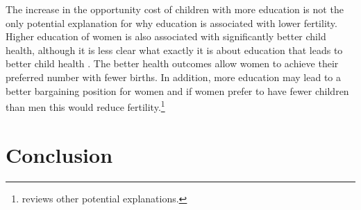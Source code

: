 \documentclass[]{article}
\begin{document}
The increase in the opportunity cost of children with more education is not the only potential explanation for why education is associated with lower fertility. Higher education of women is also associated with significantly better child health, although it is less clear what exactly it is about education that leads to better child health \citep{Thomas1991,Glewwe1999,Kovsted2002}. The better health outcomes allow women to achieve their preferred number with fewer births. In addition, more education may lead to a better bargaining position for women and if women prefer to have fewer children than men this would reduce fertility.\footnote{\citet{Ainsworth1996} reviews other potential explanations.}

\section{Conclusion}\label{conclusion}
\end{document}
